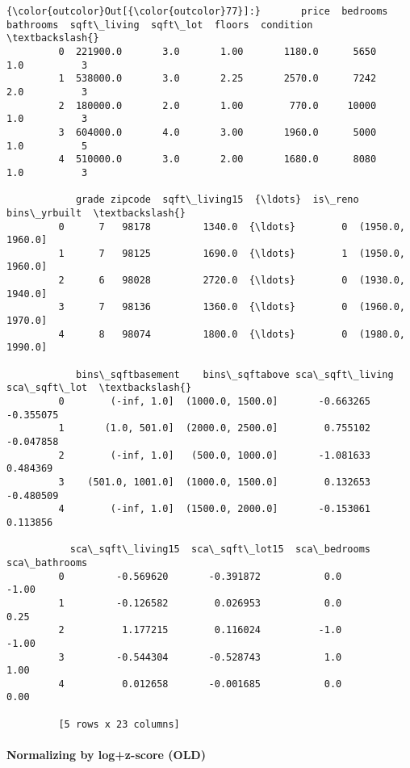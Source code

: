 \documentclass[11pt]{article}
\begin{document}
\begin{Verbatim}[commandchars=\\\{\}]
{\color{outcolor}Out[{\color{outcolor}77}]:}       price  bedrooms  bathrooms  sqft\_living  sqft\_lot  floors  condition  \textbackslash{}
         0  221900.0       3.0       1.00       1180.0      5650     1.0          3   
         1  538000.0       3.0       2.25       2570.0      7242     2.0          3   
         2  180000.0       2.0       1.00        770.0     10000     1.0          3   
         3  604000.0       4.0       3.00       1960.0      5000     1.0          5   
         4  510000.0       3.0       2.00       1680.0      8080     1.0          3   
         
            grade zipcode  sqft\_living15  {\ldots}  is\_reno      bins\_yrbuilt  \textbackslash{}
         0      7   98178         1340.0  {\ldots}        0  (1950.0, 1960.0]   
         1      7   98125         1690.0  {\ldots}        1  (1950.0, 1960.0]   
         2      6   98028         2720.0  {\ldots}        0  (1930.0, 1940.0]   
         3      7   98136         1360.0  {\ldots}        0  (1960.0, 1970.0]   
         4      8   98074         1800.0  {\ldots}        0  (1980.0, 1990.0]   
         
            bins\_sqftbasement    bins\_sqftabove sca\_sqft\_living sca\_sqft\_lot  \textbackslash{}
         0        (-inf, 1.0]  (1000.0, 1500.0]       -0.663265    -0.355075   
         1       (1.0, 501.0]  (2000.0, 2500.0]        0.755102    -0.047858   
         2        (-inf, 1.0]   (500.0, 1000.0]       -1.081633     0.484369   
         3    (501.0, 1001.0]  (1000.0, 1500.0]        0.132653    -0.480509   
         4        (-inf, 1.0]  (1500.0, 2000.0]       -0.153061     0.113856   
         
           sca\_sqft\_living15  sca\_sqft\_lot15  sca\_bedrooms  sca\_bathrooms  
         0         -0.569620       -0.391872           0.0          -1.00  
         1         -0.126582        0.026953           0.0           0.25  
         2          1.177215        0.116024          -1.0          -1.00  
         3         -0.544304       -0.528743           1.0           1.00  
         4          0.012658       -0.001685           0.0           0.00  
         
         [5 rows x 23 columns]
\end{Verbatim}
            
    \hypertarget{normalizing-by-logz-score-old}{%
\paragraph{Normalizing by log+z-score
(OLD)}\label{normalizing-by-logz-score-old}}
\end{document}
